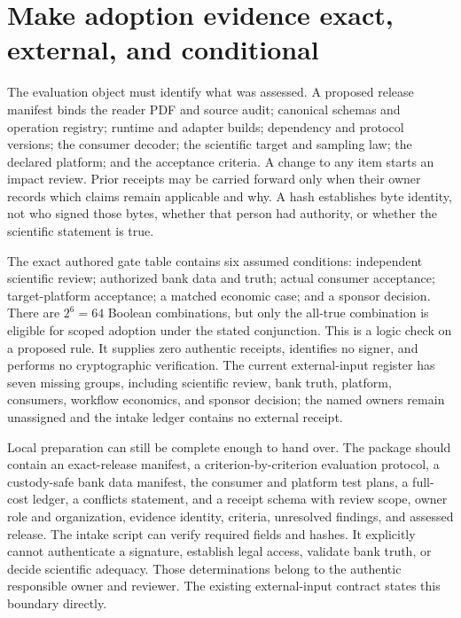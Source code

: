 \section{Make adoption evidence exact, external, and conditional}
\label{exec17:signed-adoption}

The evaluation object must identify what was assessed. A proposed release
manifest binds the reader PDF and source audit; canonical schemas and operation
registry; runtime and adapter builds; dependency and protocol versions; the
consumer decoder; the scientific target and sampling law; the declared
platform; and the acceptance criteria. A change to any item starts an impact
review. Prior receipts may be carried forward only when their owner records
which claims remain applicable and why. A hash establishes byte identity, not
who signed those bytes, whether that person had authority, or whether the
scientific statement is true.

The exact authored gate table contains six assumed conditions: independent
scientific review; authorized bank data and truth; actual consumer acceptance;
target-platform acceptance; a matched economic case; and a sponsor decision.
There are $2^6=64$ Boolean combinations, but only the all-true combination is
eligible for scoped adoption under the stated conjunction. This is a logic
check on a proposed rule. It supplies zero authentic receipts, identifies no
signer, and performs no cryptographic verification. The current external-input
register has seven missing groups, including scientific review, bank truth,
platform, consumers, workflow economics, and sponsor decision; the named
owners remain unassigned and the intake ledger contains no external
receipt.~\citep{exec17_continuity_reference,exec17_continuity_contract}

Local preparation can still be complete enough to hand over. The package
should contain an exact-release manifest, a criterion-by-criterion evaluation
protocol, a custody-safe bank data manifest, the consumer and platform test
plans, a full-cost ledger, a conflicts statement, and a receipt schema with
review scope, owner role and organization, evidence identity, criteria,
unresolved findings, and assessed release. The intake script can verify
required fields and hashes. It explicitly cannot authenticate a signature,
establish legal access, validate bank truth, or decide scientific adequacy.
Those determinations belong to the authentic responsible owner and reviewer.
The existing external-input contract states this boundary directly.
\citep{exec17_continuity_contract}

